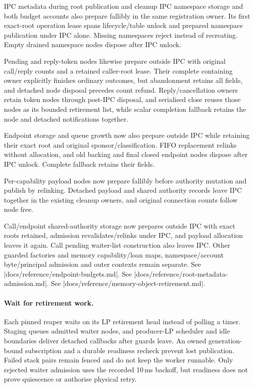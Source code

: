 \begin{implementationdetail}{IPC metadata during root publication and cleanup}
IPC namespace storage and both budget accounts also prepare fallibly in the
same registration owner. Its first exact-root operation lease spans
lifecycle/table unlock and prepared namespace publication under IPC alone.
Missing namespaces reject instead of recreating. Empty drained namespace
nodes dispose after IPC unlock.

Pending and reply-token nodes likewise prepare outside IPC
with original call/reply counts and a retained caller-root lease. Their complete
containing owner explicitly finishes ordinary outcomes, but abandonment retains all
fields, and detached node disposal precedes count refund. Reply/cancellation
owners retain token nodes through post-IPC disposal, and serialised close reuses
those nodes as its bounded retirement list, while scalar completion fallback
retains the node and detached notifications together.

Endpoint storage and queue
growth now also prepare outside IPC while retaining their exact root and
original sponsor/classification. FIFO replacement relinks without allocation, and
old backing and final closed endpoint nodes dispose after IPC unlock. Complete
fallback retains their fields.

Per-capability payload nodes now prepare fallibly
before authority mutation and publish by relinking. Detached payload and shared
authority records leave IPC together in the existing cleanup owners, and original
connection counts follow node free.

Call/endpoint shared-authority storage now
prepares outside IPC with exact roots retained, admission revalidates/relinks
under IPC, and payload allocation leaves it again. Call pending waiter-list
construction also leaves IPC. Other guarded factories and memory capability/loan maps,
namespace/account byte/principal admission and outer
contexts remain separate. See
\repofile|docs/reference/endpoint-budgets.md|. See
\repofile|docs/reference/root-metadata-admission.md|. See
\repofile|docs/reference/memory-object-retirement.md|.
\end{implementationdetail}

\paragraph*{Wait for retirement work.}

Each pinned reaper waits on its LP retirement head instead of polling a timer.
Staging queues admitted waiter nodes, and producer-LP scheduler and idle boundaries
deliver detached callbacks after guards leave. An owned generation-bound subscription
and a durable readiness recheck prevent lost publication. Failed stack pairs
remain fenced and do not keep the worker runnable. Only rejected waiter
admission uses the recorded 10\,ms backoff, but readiness does not prove quiescence
or authorise physical retry.

